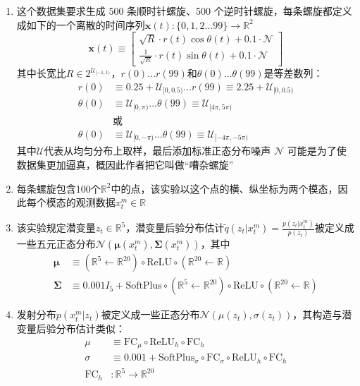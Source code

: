 \documentclass[11pt]{article}
\begin{document}
\begin{enumerate}
\begin{enumerate}
\item 这个数据集要求生成 500 条顺时针螺旋、500 个逆时针螺旋，每条螺旋都定义成如下的一个离散的时间序列$\mathbf{x}(t):\{0,1,2\dots99\}\to\mathbb{R}^2$\[
\mathbf{x}(t)\equiv\begin{bmatrix}
\sqrt{R}\cdot r(t)\cos\theta(t)+0.1\cdot\mathcal{N}\\
\frac{1}{\sqrt{R}}\cdot r(t)\sin\theta(t)+0.1\cdot\mathcal{N}
\end{bmatrix}
\]其中长宽比$R\in2^{\mathcal{U}_{[-1,1)}}$，$r(0)\dots r(99)$和$\theta(0)\dots\theta(99)$是等差数列：\[
\begin{split}
r(0)&\equiv0.25+\mathcal{U}_{[0,0.5)}\dots r(99)\equiv2.25+\mathcal{U}_{[0,0.5)}\\
\theta(0)&\equiv\mathcal{U}_{[0,\pi)}\dots\theta(99)\equiv\mathcal{U}_{[4\pi,5\pi)}\\
&\text{或}\\
\theta(0)&\equiv\mathcal{U}_{[0,-\pi)}\dots\theta(99)\equiv\mathcal{U}_{[-4\pi,-5\pi)}
\end{split}
\]其中$\mathcal{U}$代表从均匀分布上取样，最后添加标准正态分布噪声 $\mathcal{N}$ 可能是为了使数据集更加逼真，概因此作者把它叫做“嘈杂螺旋”
\item 每条螺旋包含100个$\mathbb{R}^2$中的点，该实验以这个点的横、纵坐标为两个模态，因此每个模态的观测数据$x_t^m\in\mathbb{R}$
\item 该实验规定潜变量$z_t\in\mathbb{R}^5$，潜变量后验分布估计$\tilde{q}(z_t|x_t^m) = \frac{p(z_t|x_t^m)}{p(z_t)}$被定义成一些五元正态分布$\mathcal{N}(\boldsymbol{\mu}(x_t^m),\boldsymbol{\Sigma}(x_t^m))$，其中\[
\begin{split}
\boldsymbol{\mu}&\equiv(\mathbb{R}^5\leftarrow\mathbb{R}^{20})\circ\text{ReLU}\circ(\mathbb{R}^{20}\leftarrow\mathbb{R})\\
\boldsymbol{\Sigma}&\equiv0.001I_5+\text{SoftPlus}\circ(\mathbb{R}^5\leftarrow\mathbb{R}^{20})\circ\text{ReLU}\circ(\mathbb{R}^{20}\leftarrow\mathbb{R})
\end{split}
\]
\item 发射分布$p(x_t^m|z_t)$被定义成一些正态分布$\mathcal{N}(\mu(z_t), \sigma(z_t))$，其构造与潜变量后验分布估计类似：\[
\begin{split}
\mu&\equiv\text{FC}_\mu\circ\text{ReLU}_h\circ \text{FC}_h\\
\sigma&\equiv0.001+\text{SoftPlus}_\sigma\circ \text{FC}_\sigma\circ\text{ReLU}_h\circ \text{FC}_h\\
\text{FC}_h&: \mathbb{R}^5\to\mathbb{R}^{20}\\

\end{split}\]
\end{enumerate}
\end{enumerate}
\end{document}
